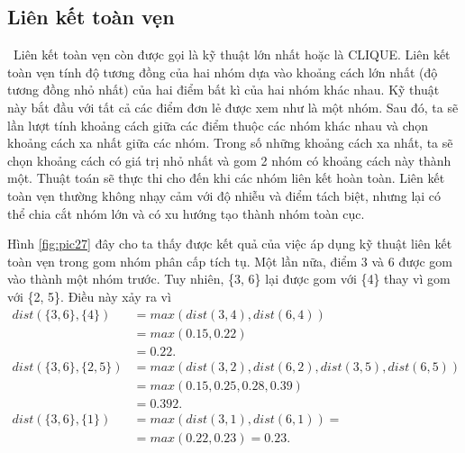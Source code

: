 \subsection{Liên kết toàn vẹn}		
~\cite{Vipin-Kumar, HAC, AHC, hierarchical-clustering, single-complete}Liên kết toàn vẹn còn được gọi là kỹ thuật lớn nhất hoặc là CLIQUE.
Liên kết toàn vẹn tính độ tương đồng của hai nhóm dựa vào khoảng cách lớn nhất (độ tương đồng nhỏ nhất) của hai điểm bất kì của hai nhóm khác nhau.
Kỹ thuật này bắt đầu với tất cả các điểm đơn lẻ được xem như là một nhóm.
Sau đó, ta sẽ lần lượt tính khoảng cách giữa các điểm thuộc các nhóm khác nhau và chọn khoảng cách xa nhất giữa các nhóm.
Trong số những khoảng cách xa nhất, ta sẽ chọn khoảng cách có giá trị nhỏ nhất và gom 2 nhóm có khoảng cách này thành một.
Thuật toán sẽ thực thi cho đến khi các nhóm liên kết hoàn toàn.
Liên kết toàn vẹn thường không nhạy cảm với độ nhiễu và điểm tách biệt, nhưng lại có thể chia cắt nhóm lớn và có xu hướng tạo thành nhóm toàn cục.

Hình \ref{fig:pic27} đây cho ta thấy được kết quả của việc áp dụng kỹ thuật liên kết toàn vẹn trong gom nhóm phân cấp tích tụ.
Một lần nữa, điểm 3 và 6 được gom vào thành một nhóm trước.
Tuy nhiên, \{3, 6\} lại được gom với \{4\} thay vì gom với \{2, 5\}.
Điều này xảy ra vì 
\begin{equation}
\begin{aligned}
dist(\{3, 6\}, \{4\})
&= max(dist(3, 4), dist(6, 4)) 		\\
&= max(0.15, 0.22) 					\\
&= 0.22.							\\
dist(\{3, 6\}, \{2, 5\})
&= max(dist(3, 2), dist(6, 2), dist(3, 5), dist(6, 5))			\\
&= max(0.15, 0.25, 0.28, 0.39)									\\
&= 0.392.										\\					
dist(\{3, 6\}, \{1\})
&= max(dist(3, 1), dist(6, 1)) =	\\ 
&= max(0.22, 0.23) = 0.23.		\\
\end{aligned}
\end{equation}

